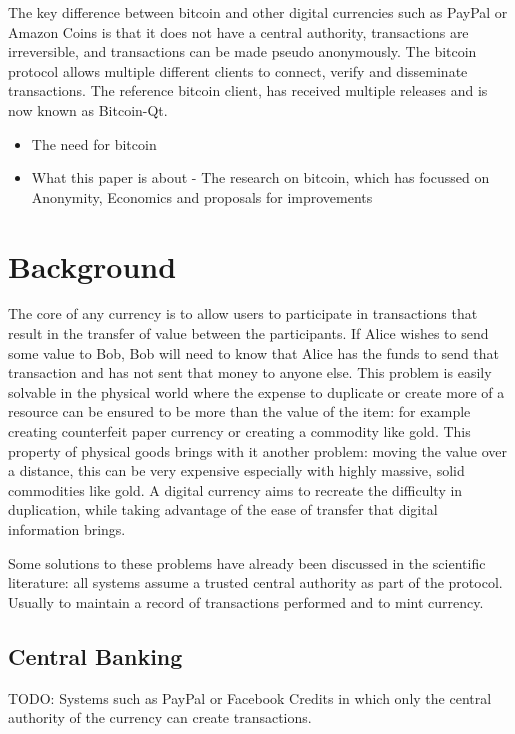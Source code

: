 The key difference between bitcoin and other digital currencies such as PayPal or Amazon Coins
is that it does not have a central authority, transactions are
irreversible, and transactions can be made pseudo anonymously.  The bitcoin
protocol allows multiple different clients to connect, verify and disseminate
transactions.  The reference bitcoin client, has received multiple releases and
is now known as Bitcoin-Qt.

\begin{itemize} \item The need for bitcoin \item What this paper is about - The
    research on bitcoin, which has focussed on Anonymity, Economics and
    proposals for improvements \end{itemize}

\section{Background} The core of any currency is to allow users to participate
in transactions that result in the transfer of value between the participants.
If Alice wishes to send some value to Bob, Bob will need to know that Alice has
the funds to send that transaction and has not sent that money to anyone else.
This problem is easily solvable in the physical world where the expense to
duplicate or create more of a resource can be ensured to be more than the value
of the item: for example creating counterfeit paper currency or creating a
commodity like gold.  This property of physical goods brings with it another
problem: moving the value over a distance, this can be very expensive especially
with highly massive, solid commodities like gold.  A digital currency aims to
recreate the difficulty in duplication, while taking advantage of the ease of
transfer that digital information brings.

Some solutions to these problems have already been discussed in the scientific
literature: all systems assume a trusted central authority as part of the
protocol. Usually to maintain a record of transactions performed and to mint
currency.

\subsection{Central Banking} TODO: Systems such as PayPal or Facebook Credits in
which only the central authority of the currency can create transactions.

